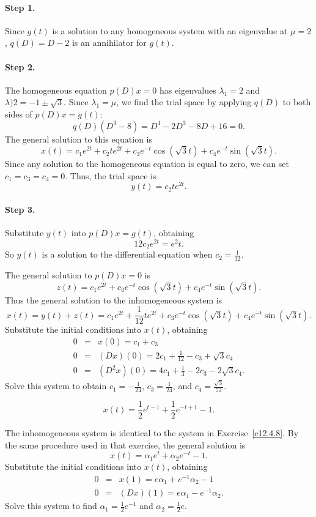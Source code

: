 \documentclass{ximera}
\begin{document}
\paragraph{Step 1.} Since $g(t)$ is a solution to any homogeneous
system with an eigenvalue at $\mu = 2$, $q(D) = D - 2$ is an annihilator
for $g(t)$.

\paragraph{Step 2.} The homogeneous equation $p(D)x = 0$ has eigenvalues
$\lambda_1 = 2$ and $\lambda)2 = -1 \pm \sqrt{3}$.  Since $\lambda_1 =
\mu$, we find the trial space by applying $q(D)$ to both sides of
$p(D)x = g(t)$:
\[
q(D)(D^3 - 8) = D^4 - 2D^3 - 8D + 16 = 0.
\]
The general solution to this equation is
\[
x(t) = c_1e^{2t} + c_2te^{2t} + c_3e^{-t}\cos(\sqrt{3}t)
+ c_4e^{-t}\sin(\sqrt{3}t).
\]
Since any solution to the homogeneous equation is equal to zero, we can
set $c_1 = c_3 = c_4 = 0$.  Thus, the trial space is
\[
y(t) = c_2te^{2t}.
\]
\paragraph{Step 3.} Substitute $y(t)$ into $p(D)x = g(t)$, obtaining
\[
12c_2e^{2t} = e^2t.
\]
So $y(t)$ is a solution to the differential equation when $c_2 = \frac{1}{12}$.

\para The general solution to $p(D)x = 0$ is
\[
z(t) = c_1e^{2t} + c_3e^{-t}\cos(\sqrt{3}t) + c_4e^{-t}\sin(\sqrt{3}t).
\]
Thus the general solution to the inhomogeneous system is
\[
x(t) = y(t) + z(t) = c_1e^{2t} + \frac{1}{12}te^{2t}
+ c_3e^{-t}\cos(\sqrt{3}t) + c_4e^{-t}\sin(\sqrt{3}t).
\]
Substitute the initial conditions into $x(t)$, obtaining
\[
\begin{array}{rcl}
0 & = & x(0) = c_1 + c_3 \\
0 & = & (Dx)(0) = 2c_1 + \frac{1}{12} - c_3 + \sqrt{3}c_4 \\
0 & = & (D^2x)(0) = 4c_1 + \frac{1}{3} - 2c_3 - 2\sqrt{3}c_4.
\end{array}
\]
Solve this system to obtain $c_1 = -\frac{1}{24}$, $c_3 = \frac{1}{24}$,
and $c_4 = \frac{\sqrt{3}}{72}$.

 \ans
\[
x(t) = \frac{1}{2}e^{t - 1} + \frac{1}{2}e^{-t + 1} - 1.
\]

\soln The inhomogeneous system is identical to the system in
Exercise~\ref{c12.4.8}.  By the same procedure used in that exercise,
the general solution is
\[
x(t) = \alpha_1e^t + \alpha_2e^{-t} - 1.
\]
Substitute the initial conditions into $x(t)$, obtaining
\[
\begin{array}{rcl}
0 & = & x(1) = e\alpha_1 + e^{-1}\alpha_2 - 1 \\
0 & = & (Dx)(1) = e\alpha_1 - e^{-1}\alpha_2.
\end{array}
\]
Solve this system to find $\alpha_1 = \frac{1}{2}e^{-1}$ and
$\alpha_2 = \frac{1}{2}e$.
\end{document}
